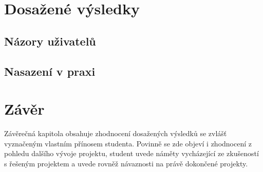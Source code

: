 \chapter{Dosažené výsledky}
\section{Názory uživatelů}
\section{Nasazení v praxi}

\chapter{Závěr}
Závěrečná kapitola obsahuje zhodnocení dosažených výsledků se zvlášť vyznačeným vlastním přínosem studenta. Povinně se zde objeví i zhodnocení z pohledu dalšího vývoje projektu, student uvede náměty vycházející ze zkušeností s řešeným projektem a uvede rovněž návaznosti na právě dokončené projekty.

